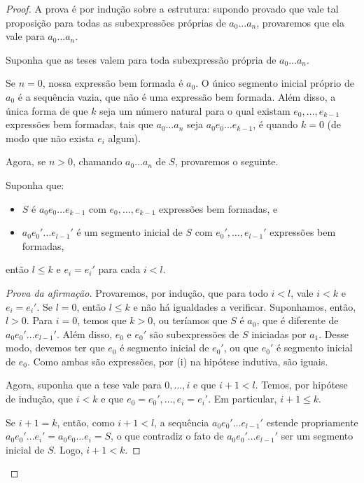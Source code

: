 \begin{proof}
    A prova é por indução sobre a estrutura: supondo provado que vale tal proposição para todas as subexpressões próprias de $a_0\dots a_n$, provaremos que ela vale para $a_0\dots a_n$.


    Suponha que as teses valem para toda subexpressão própria de $a_0\dots a_n$.

    Se $n=0$, nossa expressão bem formada é $a_0$.
    O único segmento inicial próprio de $a_0$ é a sequência vazia, que não é uma expressão bem formada.
    Além disso, a única forma de que $k$ seja um número natural para o qual existam $e_0,\dots,e_{k-1}$ expressões bem formadas, tais que $a_0\dots a_n$ seja $a_0e_0\dots e_{k-1}$, é quando $k=0$ (de modo que não exista $e_i$ algum).

    Agora, se $n>0$, chamando $a_0\dots a_n$ de $S$, provaremos o seguinte.
    
\begin{claim}\label{clm:comparacaoDecomposicoes} Suponha que:
        \begin{itemize}
            \item $S$ é $a_0e_0\dots e_{k-1}$ com $e_0,\dots,e_{k-1}$ expressões bem formadas, e
            \item $a_0e_0'\dots e_{l-1}'$ é um segmento inicial de $S$ com $e_0',\dots,e_{l-1}'$ expressões bem formadas,
        \end{itemize}
        então $l\leq k$ e $e_i=e_i'$ para cada $i<l$.
    \end{claim}
    \begin{proof}[Prova da afirmação]
        Provaremos, por indução, que para todo $i<l$, vale $i<k$ e $e_i=e_i'$.
        Se $l=0$, então $l\leq k$ e não há igualdades a verificar.
        Suponhamos, então, $l>0$.
        Para $i=0$, temos que $k>0$, ou teríamos que $S$ é $a_0$, que é diferente de $a_0e_0'\dots e_{l-1}'$.
        Além disso, $e_0$ e $e_0'$ são subexpressões de $S$ iniciadas por $a_1$.
        Desse modo, devemos ter que $e_0$ é segmento inicial de $e_0'$, ou que $e_0'$ é segmento inicial de $e_0$.
        Como ambas são expressões, por (i) na hipótese indutiva, são iguais.

        Agora, suponha que a tese vale para $0, \dots, i$ e que $i+1<l$.
        Temos, por hipótese de indução, que $i<k$ e que $e_0=e_0', \dots, e_i=e_i'$.
        Em particular, $i+1\leq k$.
        
        Se $i+1=k$, então, como $i+1<l$, a sequência $a_0e_0'\dots e_{l-1}'$ estende propriamente
        $a_0e_0'\dots e_i'=a_0e_0\dots e_i=S$, o que contradiz o fato de
        $a_0e_0'\dots e_{l-1}'$ ser um segmento inicial de $S$.
        Logo, $i+1<k$.


\end{proof}
\end{proof}
